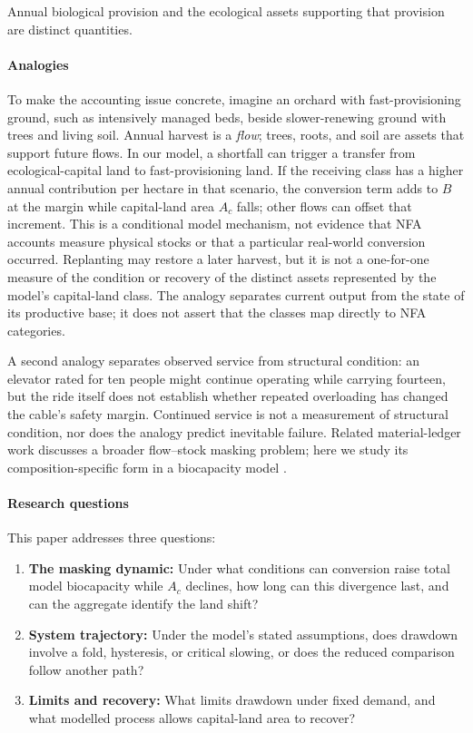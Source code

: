 \documentclass[preprint,12pt,authoryear]{elsarticle}
\begin{document}
Annual biological provision and the ecological assets supporting that provision are distinct quantities.

\paragraph{Analogies} To make the accounting issue concrete, imagine an orchard with fast-provisioning ground, such as intensively managed beds, beside slower-renewing ground with trees and living soil. Annual harvest is a \emph{flow}; trees, roots, and soil are assets that support future flows. In our model, a shortfall can trigger a transfer from ecological-capital land to fast-provisioning land. If the receiving class has a higher annual contribution per hectare in that scenario, the conversion term adds to $B$ at the margin while capital-land area $A_c$ falls; other flows can offset that increment. This is a conditional model mechanism, not evidence that NFA accounts measure physical stocks or that a particular real-world conversion occurred. Replanting may restore a later harvest, but it is not a one-for-one measure of the condition or recovery of the distinct assets represented by the model's capital-land class. The analogy separates current output from the state of its productive base; it does not assert that the classes map directly to NFA categories.

A second analogy separates observed service from structural condition: an elevator rated for ten people might continue operating while carrying fourteen, but the ride itself does not establish whether repeated overloading has changed the cable's safety margin. Continued service is not a measurement of structural condition, nor does the analogy predict inevitable failure. Related material-ledger work discusses a broader flow--stock masking problem; here we study its composition-specific form in a biocapacity model \citep{Abaee2026c}.

\paragraph{Research questions} This paper addresses three questions:
\begin{enumerate}
  \item \textbf{The masking dynamic:} Under what conditions can conversion raise total model biocapacity while $A_c$ declines, how long can this divergence last, and can the aggregate identify the land shift?
  \item \textbf{System trajectory:} Under the model's stated assumptions, does drawdown involve a fold, hysteresis, or critical slowing, or does the reduced comparison follow another path?
  \item \textbf{Limits and recovery:} What limits drawdown under fixed demand, and what modelled process allows capital-land area to recover?
\end{enumerate}
\end{document}
